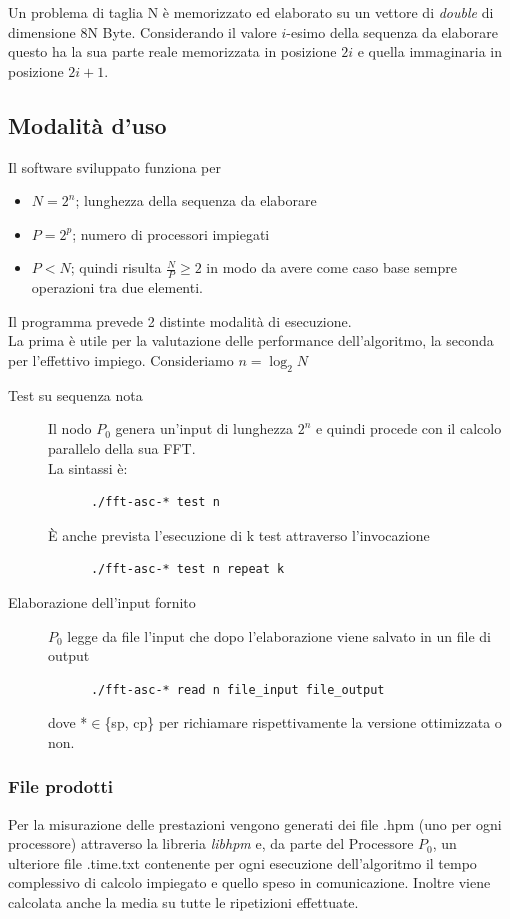 \documentclass[12pt,a4paper,oneside,openright]{article}
\begin{document}
Un problema di taglia N è memorizzato ed elaborato su un vettore di \emph{double} di dimensione 8N Byte.
Considerando il valore $i$-esimo della sequenza da elaborare questo ha la sua parte reale memorizzata in posizione $2i$ e quella immaginaria in posizione $2i+1$.


\subsection{Modalità d'uso}

Il software sviluppato funziona per
\begin{itemize}
\item $N=2^{n}$; lunghezza della sequenza da elaborare
\item $P=2^{p}$; numero di processori impiegati
\item $P<N$; quindi risulta $\frac{N}{P}\geq 2$ in modo da avere come caso base sempre operazioni tra due elementi.
\end{itemize}

\noindent Il programma prevede 2 distinte modalità di esecuzione.\\
La prima è utile per la valutazione delle performance dell'algoritmo, la seconda per l'effettivo impiego.
Consideriamo $n=\log_{2}N$
\begin{description}
\item[ Test su sequenza nota ] Il nodo $P_{0}$ genera un'input di lunghezza $2^{n}$  e quindi procede con il calcolo parallelo della sua FFT. \\ La sintassi è:
\begin{verbatim}
      ./fft-asc-* test n
\end{verbatim}
È anche prevista l'esecuzione di k test attraverso l'invocazione
\begin{verbatim}
      ./fft-asc-* test n repeat k
\end{verbatim}

\item[ Elaborazione dell'input fornito]  $P_{0}$ legge da file l'input che dopo l'elaborazione viene salvato in un file di output
\begin{verbatim}
      ./fft-asc-* read n file_input file_output
\end{verbatim}
dove *$\in$\{sp, cp\} per richiamare rispettivamente la versione ottimizzata o non.
\end{description}
\subsubsection*{File prodotti }
Per la misurazione delle prestazioni vengono generati dei file .hpm (uno per ogni processore) attraverso la libreria \emph{libhpm} e, da parte del Processore $P_{0}$, un ulteriore file .time.txt contenente per ogni esecuzione dell'algoritmo il tempo complessivo di calcolo impiegato e quello speso in comunicazione. Inoltre viene calcolata anche la media su tutte le ripetizioni effettuate. 
\end{document}
